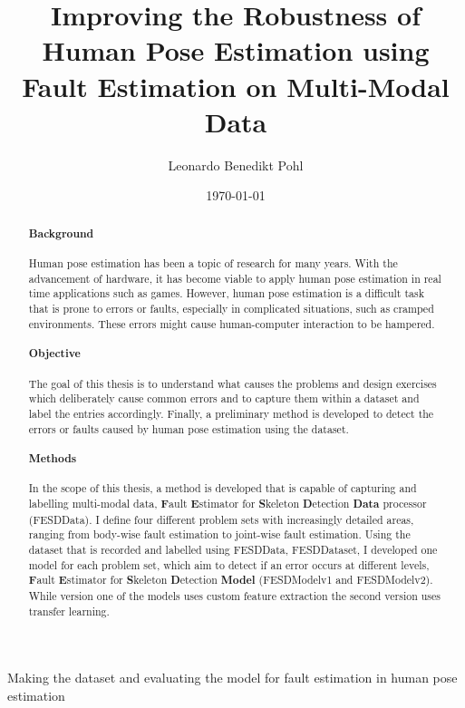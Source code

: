 
\title{Improving the Robustness of Human Pose Estimation using Fault Estimation on Multi-Modal Data}
\author{Leonardo Benedikt Pohl}
Making the dataset and evaluating the model for fault estimation in human pose estimation

\date{\today}


% 


\clearpage

\begin{abstract}  
  \paragraph{Background}
  Human pose estimation has been a topic of research for many years. With the advancement of hardware, it has become viable to apply human pose estimation in real time applications such as games. However, human pose estimation is a difficult task that is prone to errors or faults, especially in complicated situations, such as cramped environments. These errors might cause human-computer interaction to be hampered.

  \paragraph{Objective}
  The goal of this thesis is to understand what causes the problems and design exercises which deliberately cause common errors and to capture them within a dataset and label the entries accordingly. Finally, a preliminary method is developed to detect the errors or faults caused by human pose estimation using the dataset.

  \paragraph{Methods}
  In the scope of this thesis, a method is developed that is capable of capturing and labelling multi-modal data, \textbf{F}ault \textbf{E}stimator for \textbf{S}keleton \textbf{D}etection \textbf{Data} processor (FESDData). I define four different problem sets with increasingly detailed areas, ranging from body-wise fault estimation to joint-wise fault estimation. Using the dataset that is recorded and labelled using FESDData, FESDDataset, I developed one model for each problem set, which aim to detect if an error occurs at different levels, \textbf{F}ault \textbf{E}stimator for \textbf{S}keleton \textbf{D}etection \textbf{Model} (FESDModelv1 and FESDModelv2). While version one of the models uses custom feature extraction the second version uses transfer learning.


\end{abstract}
